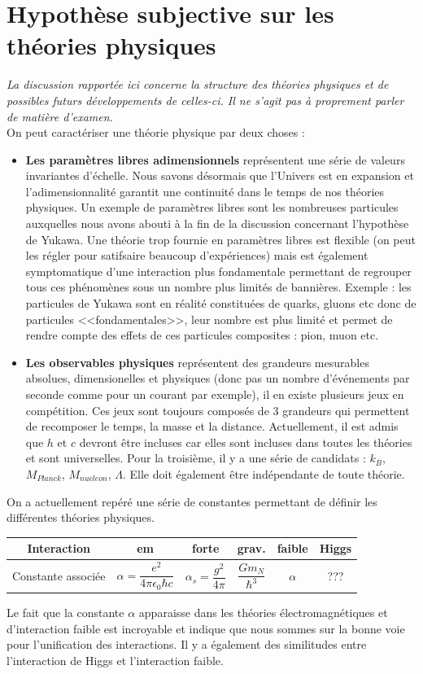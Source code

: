 \section{Hypothèse subjective sur les théories physiques}
\emph{La discussion rapportée ici concerne la structure des théories physiques et de possibles futurs développements de celles-ci. Il ne s'agit pas à proprement parler de matière d'examen.}\\
On peut caractériser une théorie physique par deux choses :
\begin{itemize}[label = $\bullet$]
    \item \textbf{Les paramètres libres adimensionnels} représentent une série de valeurs invariantes d'échelle. Nous savons désormais que l'Univers est en expansion et l'adimensionnalité garantit une continuité dans le temps de nos théories physiques. Un exemple de paramètres libres sont les nombreuses particules auxquelles nous avons abouti à la fin de la discussion concernant l'hypothèse de Yukawa. Une théorie trop fournie en paramètres libres est flexible (on peut les régler pour satifsaire beaucoup d'expériences) mais est également symptomatique d'une interaction plus fondamentale permettant de regrouper tous ces phénomènes sous un nombre plus limités de bannières. Exemple : les particules de Yukawa sont en réalité constituées de quarks, gluons etc donc de particules <<fondamentales>>, leur nombre est plus limité et permet de rendre compte des effets de ces particules composites : pion, muon etc.
    \item \textbf{Les observables physiques} représentent des grandeurs mesurables absolues, dimensionelles et physiques (donc pas un nombre d'événements par seconde comme pour un courant par exemple), il en existe plusieurs jeux en compétition. Ces jeux sont toujours composés de 3 grandeurs qui permettent de recomposer le temps, la masse et la distance. Actuellement, il est admis que $h$ et $c$ devront être incluses car elles sont incluses dans toutes les théories et sont universelles. Pour la troisième, il y a une série de candidats : $k_B$, $M_{Planck}$, $M_{nucleon}$, $\Lambda$. Elle doit également être indépendante de toute théorie.
\end{itemize}
On a actuellement repéré une série de constantes permettant de définir les différentes théories physiques.
\begin{table}[H]
    \centering
    \begin{tabular}{|c|c|c|c|c|c|}
    \hline
         Interaction &em&forte&grav.&faible & Higgs  \\
         \hline
         Constante associée& $\alpha=\dfrac{e^2}{4\pi\epsilon_0\hbar c}$&$\alpha_s=\dfrac{g^2}{4\pi}$&$\dfrac{Gm_N}{\hbar^3}$&$\alpha$&???\\
         \hline
    \end{tabular}
\end{table}
Le fait que la constante $\alpha$ apparaisse dans les théories électromagnétiques et d'interaction faible est incroyable et indique que nous sommes sur la bonne voie pour l'unification des interactions. Il y a également des similitudes entre l'interaction de Higgs et l'interaction faible.